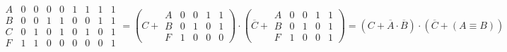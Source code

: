 \documentclass[a4paper,10pt]{article} %
\begin{document}
	\begin{equation}
		\begin{smallmatrix}
			A & 0 & 0 & 0 & 0 & 1 & 1 & 1 & 1 \\
			B & 0 & 0 & 1 & 1 & 0 & 0 & 1 & 1 \\
			C & 0 & 1 & 0 & 1 & 0 & 1 & 0 & 1 \\
			F & 1 & 1 & 0 & 0 & 0 & 0 & 0 & 1
		\end{smallmatrix}
		= \left( C + 
		\begin{smallmatrix}
			A & 0 & 0 & 1 & 1 \\
			B & 0 & 1 & 0 & 1 \\
			F & 1 & 0 & 0 & 0
		\end{smallmatrix}
		\right) \cdot \left( \overline{C} +
		\begin{smallmatrix}
			A & 0 & 0 & 1 & 1 \\
			B & 0 & 1 & 0 & 1 \\
			F & 1 & 0 & 0 & 1 
		\end{smallmatrix}
		\right) = (C + \overline{A} \cdot \overline{B}) \cdot
		 (\overline{C} + (A \equiv B)) 
	\end{equation}
\end{document}
